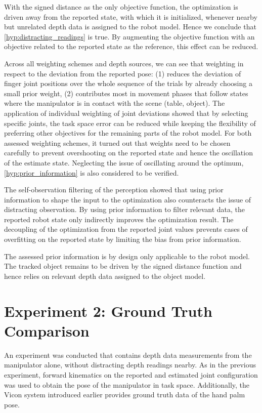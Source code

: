 With the signed distance as the only objective function, the optimization is driven away from the reported state, with which it is initialized, whenever nearby but unrelated depth data is assigned to the robot model. Hence we conclude that \cref{hyp:distracting_readings} is true. By augmenting the objective function with an objective related to the reported state as the reference, this effect can be reduced.

Across all weighting schemes and depth sources, we can see that weighting in respect to the deviation from the reported pose: (1) reduces the deviation of finger joint positions over the whole sequence of the trials by already choosing a small prior weight, (2) contributes most in movement phases that follow states where the manipulator is in contact with the scene (table, object). The application of individual weighting of joint deviations showed that by selecting specific joints, the task space error can be reduced while keeping the flexibility of preferring other objectives for the remaining parts of the robot model. For both assessed weighting schemes, it turned out that weights need to be chosen carefully to prevent overshooting on the reported state and hence the oscillation of the estimate state. Neglecting the issue of oscillating around the optimum, \cref{hyp:prior_information} is also considered to be verified.

The self-observation filtering of the perception showed that using prior information to shape the input to the optimization also counteracts the issue of distracting observation. By using prior information to filter relevant data, the reported robot state only indirectly improves the optimization result.
The decoupling of the optimization from the reported joint values prevents cases of overfitting on the reported state by limiting the bias from prior information.

The assessed prior information is by design only applicable to the robot model. The tracked object remains to be driven by the signed distance function and hence relies on relevant depth data assigned to the object model.


\section{Experiment 2: Ground Truth Comparison}
\label{sec:hand_pose_error}

An experiment was conducted that contains depth data measurements from the manipulator alone, without distracting depth readings nearby. As in the previous experiment, forward kinematics on the reported and estimated joint configuration was used to obtain the pose of the manipulator in task space. Additionally, the Vicon system introduced earlier provides ground truth data of the hand palm pose.


